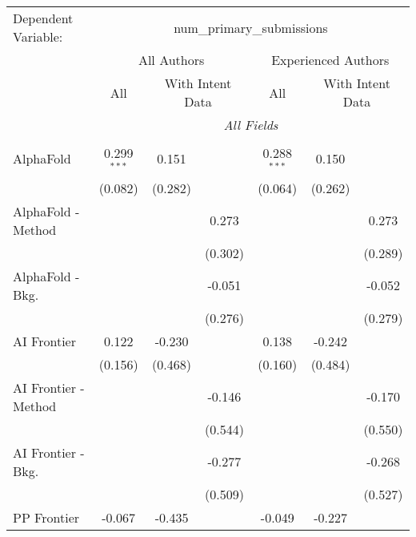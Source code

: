 \begingroup
\centering
\begin{tabular}{lcccccc}
   \tabularnewline \midrule \midrule
   Dependent Variable: & \multicolumn{6}{c}{num\_primary\_submissions}\\
 & \multicolumn{3}{c}{All Authors} & \multicolumn{3}{c}{Experienced Authors} \\
\cmidrule(lr){2-4} \cmidrule(lr){5-7}
 & \multicolumn{1}{c}{All} & \multicolumn{2}{c}{With Intent Data} & \multicolumn{1}{c}{All} & \multicolumn{2}{c}{With Intent Data} \\
\cmidrule(lr){2-2} \cmidrule(lr){3-4} \cmidrule(lr){5-5} \cmidrule(lr){6-7}
 & \multicolumn{6}{c}{\textit{All Fields}} \\ \\
   AlphaFold            & 0.299$^{***}$ & 0.151   &              & 0.288$^{***}$ & 0.150   &   \\   
                        & (0.082)       & (0.282) &              & (0.064)       & (0.262) &   \\   
   AlphaFold - Method   &               &         & 0.273        &               &         & 0.273\\   
                        &               &         & (0.302)      &               &         & (0.289)\\   
   AlphaFold - Bkg.     &               &         & -0.051       &               &         & -0.052\\   
                        &               &         & (0.276)      &               &         & (0.279)\\   
   AI Frontier          & 0.122         & -0.230  &              & 0.138         & -0.242  &   \\   
                        & (0.156)       & (0.468) &              & (0.160)       & (0.484) &   \\   
   AI Frontier - Method &               &         & -0.146       &               &         & -0.170\\   
                        &               &         & (0.544)      &               &         & (0.550)\\   
   AI Frontier - Bkg.   &               &         & -0.277       &               &         & -0.268\\   
                        &               &         & (0.509)      &               &         & (0.527)\\   
   PP Frontier          & -0.067        & -0.435  &              & -0.049        & -0.227  &   \\   

\end{tabular}
